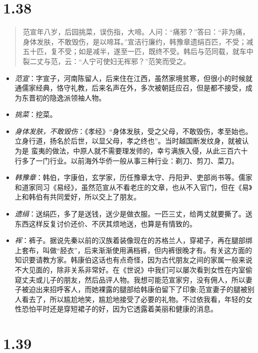 \documentclass[]{book}
\providecommand{\tightlist}{%
  \setlength{\itemsep}{0pt}\setlength{\parskip}{0pt}}
\begin{document}
\section{1.38}\label{section-37}

\begin{quote}
范宣年八岁，后园挑菜，误伤指，大啼。人问：``痛邪？''答曰：``非为痛，身体发肤，不敢毁伤，是以啼耳。''宣洁行廉约，韩豫章遗绢百匹，不受；减五十匹，复不受；如是减半，遂至一匹，既终不受。韩后与范同载，就车中裂二丈与范，云：``人宁可使妇无裈邪？''范笑而受之。
\end{quote}

\begin{itemize}
\tightlist
\item
  \emph{范宣}：字宣子，河南陈留人，后来住在江西，虽然家境贫寒，但很小的时候就通儒家经典，恪守礼教，后来名声在外，多次被朝廷应召，但是都不接受，成为东晋初的隐逸派领袖人物。
\item
  \emph{挑菜}：挖菜。
\item
  \emph{身体发肤，不敢毁伤}：《孝经》``身体发肤，受之父母，不敢毁伤，孝至始也。立身行道，扬名於后世，以显父母，孝之终也''。当时越国断发纹身，就被认为是
  蛮夷的做法，中原人就不需要理发师的，幸亏满族入侵，从此三百六十行多了一门行业。以前海外华侨一般从事三种行业：剃刀、剪刀、菜刀。
\item
  \emph{韩豫章}：韩伯，字康伯，玄学家，历任豫章太守、丹阳尹、吏部尚书等。儒家和道家同习《易经》，虽然范宣从不看老庄的文章，也从不入官门，但在《易》上和韩伯有共同爱好，所以交上了朋友。
\item
  \emph{遗绢}：送绢匹，多了是送钱，送少是做衣服。一匹三丈，给两丈就要撕了。送东西这样反复讨价还价、不厌其烦地送，也算是有情致的。
\item
  \emph{裈}：裤子。据说先秦以前的汉族着装像现在的苏格兰人，穿裙子，再在腿部绑上套布，叫做``胫衣''，后来渐渐使用满档裤，但内裤很晚才有。有关这方面的知识要请教方家。韩康伯这话也有点奇怪，因为古代朋友之间的家属一般来说不大见面的，除非关系非常好。在《世说》中我们可以屡次看到女性在内室偷窥丈夫或儿子的朋友，然后品评人物。我想可能范宣家穷，没有佣人，所以妻子被迫出来招呼客人，而她裸露的腿部给韩康伯留下了印象;范宣妻子的腿被别人看去了，所以尴尬地笑，尴尬地接受了必要的礼物。不过依我看，年轻的女性恐怕平时还是穿短裙子的好，因为它透露着美丽和健康的消息。
\end{itemize}

\section{1.39}\label{section-38}
\end{document}
